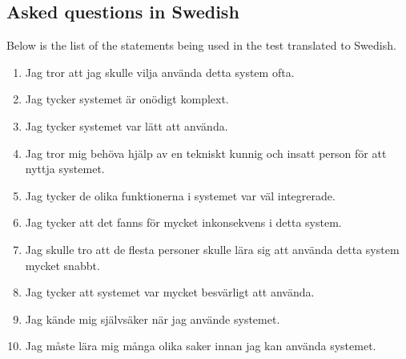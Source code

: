 \documentclass[12pt]{article}
\begin{document}
    \subsection{Asked questions in Swedish}
    Below is the list of the statements being used in the test translated to Swedish. 
    \begin{enumerate}
        \item Jag tror att jag skulle vilja använda detta system ofta.
        \item Jag tycker systemet är onödigt komplext.
        \item Jag tycker systemet var lätt att använda.
        \item Jag tror mig behöva hjälp av en tekniskt kunnig och insatt person för att nyttja systemet. 
        \item Jag tycker de olika funktionerna i systemet var väl integrerade.
        \item Jag tycker att det fanns för mycket inkonsekvens i detta system.
        \item Jag skulle tro att de flesta personer skulle lära sig att använda detta system mycket snabbt.
        \item Jag tycker att systemet var mycket besvärligt att använda.
        \item Jag kände mig självsäker när jag använde systemet.
        \item Jag måste lära mig många olika saker innan jag kan använda systemet.
    \end{enumerate}


    
\end{document}
